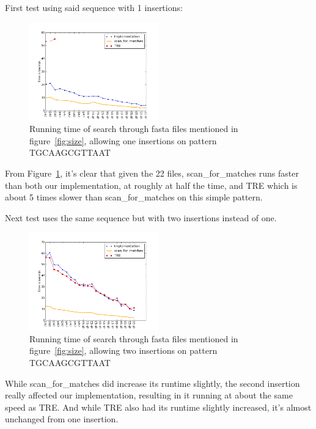 First test using said sequence with 1 insertions:
\begin{figure}[h!]
\centering
\includegraphics[width=0.5\textwidth]{Benchmarking/1ins.png}
\caption{Running time of search through fasta files mentioned in figure~\ref{fig:size},  allowing one insertions on pattern TGCAAGCGTTAAT}
\label{fig:ins1}
\end{figure}

From Figure~\ref{fig:ins1}, it's clear that given the 22 files, scan\_for\_matches runs faster than both our implementation, at roughly at half the time, and TRE which is about 5 times slower than scan\_for\_matches on this simple pattern.

Next test uses the same sequence but with two insertions instead of one.
\begin{figure}[h!]
\centering
\includegraphics[width=0.5\textwidth]{Benchmarking/2ins.png}
\caption{Running time of search through fasta files mentioned in figure~\ref{fig:size},  allowing two insertions on pattern TGCAAGCGTTAAT}
\label{fig:ins2}
\end{figure}

While scan\_for\_matches did increase its runtime slightly, the second insertion really affected our implementation, resulting in it running at about the same speed as TRE.  And while TRE also had its runtime slightly increased, it's almost unchanged from one insertion.

